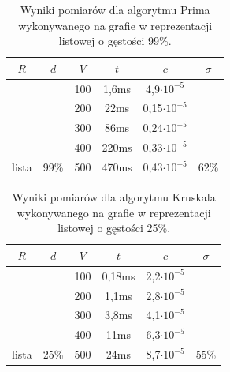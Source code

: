 \documentclass[a4paper,12pt]{article}
\begin{document}
\begin{table}[H]
	\centering
	\caption{\centering Wyniki pomiarów dla algorytmu Prima wykonywanego na grafie w reprezentacji listowej o gęstości 99\%.}
	\begin{tabular}{|c|c|c|c|c|c|}
		\hline
		\rowcolor[HTML]{C0C0C0} 
		$R$                     & $d$                    & $V$ & \multicolumn{1}{c|}{\cellcolor[HTML]{C0C0C0}$t$} & $c$                 & $\sigma$               \\ \hline
		&                        & 100 & 1,6ms                                            & 4,9$\cdot 10^{-5}$  &                        \\ \cline{3-5}
		&                        & 200 & 22ms                                             & 0,15$\cdot 10^{-5}$ &                        \\ \cline{3-5}
		&                        & 300 & 86ms                                             & 0,24$\cdot 10^{-5}$ &                        \\ \cline{3-5}
		&                        & 400 & 220ms                                            & 0,33$\cdot 10^{-5}$ &                        \\ \cline{3-5}
		\multirow{-5}{*}{lista} & \multirow{-5}{*}{99\%} & 500 & 470ms                                            & 0,43$\cdot 10^{-5}$ & \multirow{-5}{*}{62\%} \\ \hline
	\end{tabular}
\end{table}

\begin{table}[H]
	\centering
	\caption{\centering Wyniki pomiarów dla algorytmu Kruskala wykonywanego na grafie w reprezentacji listowej o gęstości 25\%.}
	\begin{tabular}{|c|c|c|c|c|c|}
		\hline
		\rowcolor[HTML]{C0C0C0} 
		$R$                     & $d$                    & $V$ & $t$    & $c$                & $\sigma$               \\ \hline
		&                        & 100 & 0,18ms & 2,2$\cdot 10^{-5}$ &                        \\ \cline{3-5}
		&                        & 200 & 1,1ms  & 2,8$\cdot 10^{-5}$ &                        \\ \cline{3-5}
		&                        & 300 & 3,8ms  & 4,1$\cdot 10^{-5}$ &                        \\ \cline{3-5}
		&                        & 400 & 11ms   & 6,3$\cdot 10^{-5}$ &                        \\ \cline{3-5}
		\multirow{-5}{*}{lista} & \multirow{-5}{*}{25\%} & 500 & 24ms   & 8,7$\cdot 10^{-5}$ & \multirow{-5}{*}{55\%} \\ \hline
	\end{tabular}
\end{table}
\end{document}
